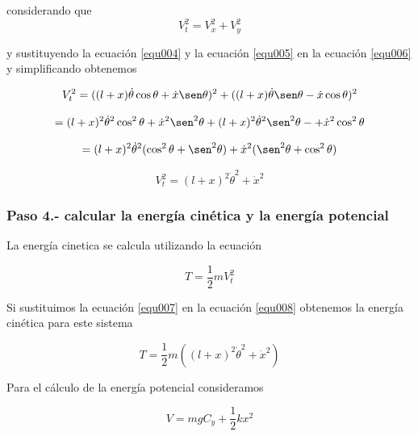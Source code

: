 \documentclass[12pt]{book}
\theoremstyle{definition}
\theoremstyle{remark}
\theoremstyle{plain}
\begin{document}
considerando que 
\begin{equation}
\label{equ006}
V_t ^2 = V_x ^2 + V_y ^2
\end{equation}

y sustituyendo la ecuación \ref{equ004} y la ecuación \ref{equ005} en la ecuación \ref{equ006} y simplificando obtenemos

\begin{equation*}
V_t ^2 = ( (l+x) \dot{\theta} \cos \theta+ \dot{x} \sen \theta  ) ^2 + ( (l+x) \dot{\theta} \sen \theta-  \dot{x} \cos \theta ) ^2
\end{equation*}

\begin{equation*}
=  (l+x)^2 \dot{\theta} ^2 \cos ^2 \theta+ \dot{x} ^2 \sen ^2 \theta  +  (l+x) ^2 \dot{\theta} ^2 \sen ^2 \theta-+ \dot{x} ^2 \cos ^2 \theta
\end{equation*}

\begin{equation*}
=  (l+x)^2 \dot{\theta} ^2 ( \cos ^2 \theta+  \sen ^2 \theta)+ \dot{x} ^2 ( \sen ^2 \theta+ \cos ^2 \theta)
\end{equation*}


\begin{equation}
\label{equ007}
V_t ^2=  (l+x)^2 \dot{\theta} ^2 + \dot{x} ^2 
\end{equation}

\subsubsection{Paso 4.- calcular la energía cinética y la energía potencial}
La energía cinetica se calcula utilizando la ecuación

\begin{equation}
\label{equ008}
T = \frac{1}{2}m V_t ^2
\end{equation}

Si sustituimos la ecuación \ref{equ007} en la ecuación \ref{equ008} obtenemos la energía cinética para este sistema

\begin{equation}
\label{equ009}
T = \frac{1}{2}m (  (l+x)^2 \dot{\theta} ^2 +\dot{x} ^2 )
\end{equation}

Para el cálculo de la energía potencial consideramos 

\begin{equation}
\label{equ010}
V = m g C_y +\frac{1}{2} k x^2
\end{equation}
 
\end{document}
